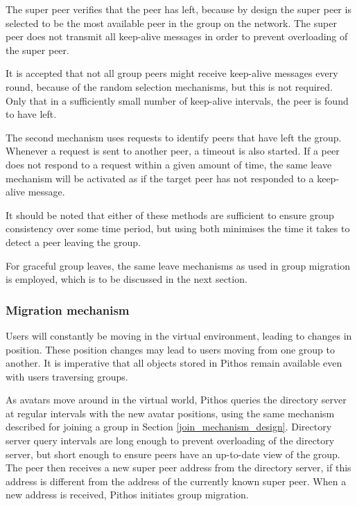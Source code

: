 The super peer verifies that the peer has left, because by design the super peer is selected to be the most available peer in the group on the network. The super peer does not transmit all keep-alive messages in order to prevent overloading of the super peer.

It is accepted that not all group peers might receive keep-alive messages every round, because of the random selection mechanisms, but this is not required. Only that in a sufficiently small number of keep-alive intervals, the peer is found to have left.

The second mechanism uses requests to identify peers that have left the group. Whenever a request is sent to another peer, a timeout is also started. If a peer does not respond to a request within a given amount of time, the same leave mechanism will be activated as if the target peer has not responded to a keep-alive message.

It should be noted that either of these methods are sufficient to ensure group consistency over some time period, but using both minimises the time it takes to detect a peer leaving the group.

For graceful group leaves, the same leave mechanisms as used in group migration is employed, which is to be discussed in the next section.

\subsubsection{Migration mechanism}
\label{migration_design}

Users will constantly be moving in the virtual environment, leading to changes in position. These position changes may lead to users moving from one group to another. It is imperative that all objects stored in Pithos remain available even with users traversing groups.

As avatars move around in the virtual world, Pithos queries the directory server at regular intervals with the new avatar positions, using the same mechanism described for joining a group in Section \ref{join_mechanism_design}. Directory server query intervals are long enough to prevent overloading of the directory server, but short enough to ensure peers have an up-to-date view of the group. The peer then receives a new super peer address from the directory server, if this address is different from the address of the currently known super peer. When a new address is received, Pithos initiates group migration.

